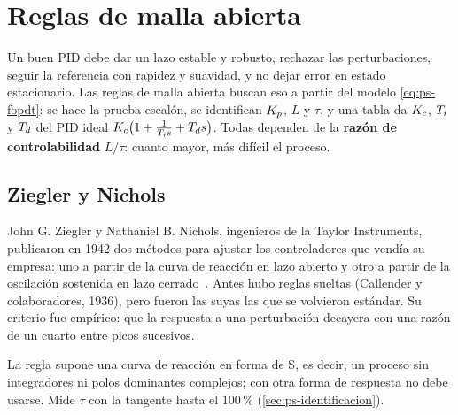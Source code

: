 \section{Reglas de malla abierta}
\label{sec:ps-malla-abierta}

Un buen PID debe dar un lazo estable y robusto, rechazar las perturbaciones, seguir la referencia con rapidez y suavidad, y no dejar error en estado estacionario. Las reglas de malla abierta buscan eso a partir del modelo \eqref{eq:ps-fopdt}: se hace la prueba escalón, se identifican $K_p$, $L$ y $\tau$, y una tabla da $K_c$, $T_i$ y $T_d$ del PID ideal $K_c\bigl(1+\frac{1}{T_i s}+T_d s\bigr)$. Todas dependen de la \textbf{razón de controlabilidad} $L/\tau$: cuanto mayor, más difícil el proceso.

\subsection{Ziegler y Nichols}

\begin{historia}
John G. Ziegler y Nathaniel B. Nichols, ingenieros de la Taylor Instruments, publicaron en 1942 dos métodos para ajustar los controladores que vendía su empresa: uno a partir de la curva de reacción en lazo abierto y otro a partir de la oscilación sostenida en lazo cerrado~\citep{ZiNi42}. Antes hubo reglas sueltas (Callender y colaboradores, 1936), pero fueron las suyas las que se volvieron estándar. Su criterio fue empírico: que la respuesta a una perturbación decayera con una razón de un cuarto entre picos sucesivos.
\end{historia}

La regla supone una curva de reacción en forma de S, es decir, un proceso sin integradores ni polos dominantes complejos; con otra forma de respuesta no debe usarse. Mide $\tau$ con la tangente hasta el $100$\,\% (\cref{sec:ps-identificacion}).

